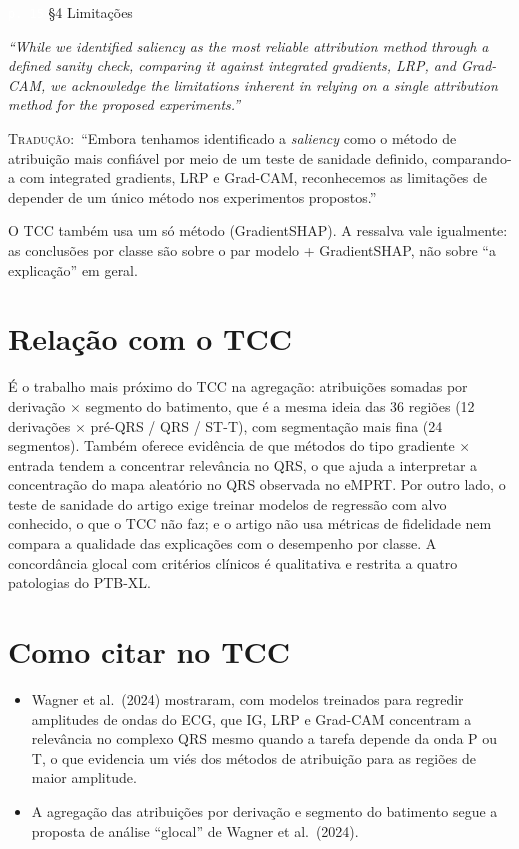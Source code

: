 \documentclass[11pt,a4paper]{article}
\newcommand{\pagechip}[1]{{\setlength{\fboxsep}{1.5pt}\colorbox{cAcc}{\textcolor{white}{\scriptsize\texttt{#1}}}}}
\newenvironment{origquote}{\par\itshape\small}{\par}
\newenvironment{tradquote}{\par\small\textsc{Tradução:}\ }{\par}
\newcommand{\explab}[1]{\par\smallskip{\small\color{cAcc}\textbf{\MakeUppercase{#1}}}\par}
\begin{document}
\begin{citacard}{\pagechip{p. 15} §4 Limitações}
\begin{origquote}“While we identified saliency as the most reliable attribution method through a defined sanity check, comparing it against integrated gradients, LRP, and Grad-CAM, we acknowledge the limitations inherent in relying on a single attribution method for the proposed experiments.”\end{origquote}
\begin{tradquote}“Embora tenhamos identificado a \textit{saliency} como o método de atribuição mais confiável por meio de um teste de sanidade definido, comparando-a com integrated gradients, LRP e Grad-CAM, reconhecemos as limitações de depender de um único método nos experimentos propostos.”\end{tradquote}
\explab{Explicação}
O TCC também usa um só método (GradientSHAP). A ressalva vale igualmente: as conclusões por classe são sobre o par modelo + GradientSHAP, não sobre “a explicação” em geral.
\end{citacard}

\section{Relação com o TCC}
É o trabalho mais próximo do TCC na agregação: atribuições somadas por derivação $\times$ segmento do batimento, que é a mesma ideia das 36 regiões (12 derivações $\times$ pré-QRS / QRS / ST-T), com segmentação mais fina (24 segmentos). Também oferece evidência de que métodos do tipo gradiente $\times$ entrada tendem a concentrar relevância no QRS, o que ajuda a interpretar a concentração do mapa aleatório no QRS observada no eMPRT. Por outro lado, o teste de sanidade do artigo exige treinar modelos de regressão com alvo conhecido, o que o TCC não faz; e o artigo não usa métricas de fidelidade nem compara a qualidade das explicações com o desempenho por classe. A concordância glocal com critérios clínicos é qualitativa e restrita a quatro patologias do PTB-XL.

\section{Como citar no TCC}
\begin{itemize}
  \item Wagner et al.\ (2024) mostraram, com modelos treinados para regredir amplitudes de ondas do ECG, que IG, LRP e Grad-CAM concentram a relevância no complexo QRS mesmo quando a tarefa depende da onda P ou T, o que evidencia um viés dos métodos de atribuição para as regiões de maior amplitude.
  \item A agregação das atribuições por derivação e segmento do batimento segue a proposta de análise “glocal” de Wagner et al.\ (2024).
\end{itemize}
\end{document}
